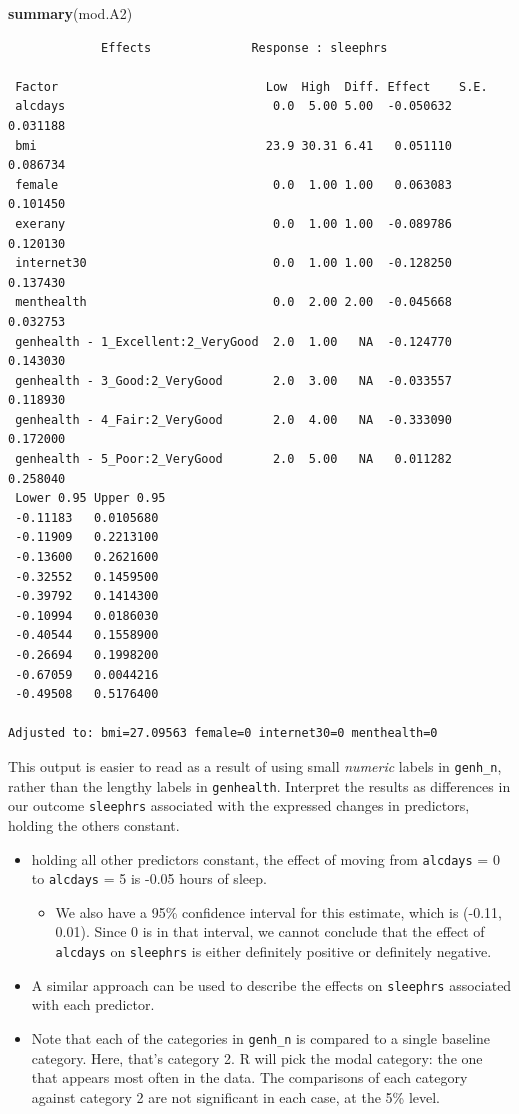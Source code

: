 \documentclass[]{book}
\newenvironment{Shaded}{\begin{snugshade}}{\end{snugshade}}
\newcommand{\KeywordTok}[1]{\textcolor[rgb]{0.13,0.29,0.53}{\textbf{#1}}}
\newcommand{\NormalTok}[1]{#1}
\providecommand{\tightlist}{%
  \setlength{\itemsep}{0pt}\setlength{\parskip}{0pt}}
\theoremstyle{definition}
\theoremstyle{definition}
\theoremstyle{definition}
\theoremstyle{remark}
\begin{document}
\begin{Shaded}
\begin{Highlighting}[]
\KeywordTok{summary}\NormalTok{(mod.A2)}
\end{Highlighting}
\end{Shaded}

\begin{verbatim}
             Effects              Response : sleephrs 

 Factor                             Low  High  Diff. Effect    S.E.    
 alcdays                             0.0  5.00 5.00  -0.050632 0.031188
 bmi                                23.9 30.31 6.41   0.051110 0.086734
 female                              0.0  1.00 1.00   0.063083 0.101450
 exerany                             0.0  1.00 1.00  -0.089786 0.120130
 internet30                          0.0  1.00 1.00  -0.128250 0.137430
 menthealth                          0.0  2.00 2.00  -0.045668 0.032753
 genhealth - 1_Excellent:2_VeryGood  2.0  1.00   NA  -0.124770 0.143030
 genhealth - 3_Good:2_VeryGood       2.0  3.00   NA  -0.033557 0.118930
 genhealth - 4_Fair:2_VeryGood       2.0  4.00   NA  -0.333090 0.172000
 genhealth - 5_Poor:2_VeryGood       2.0  5.00   NA   0.011282 0.258040
 Lower 0.95 Upper 0.95
 -0.11183   0.0105680 
 -0.11909   0.2213100 
 -0.13600   0.2621600 
 -0.32552   0.1459500 
 -0.39792   0.1414300 
 -0.10994   0.0186030 
 -0.40544   0.1558900 
 -0.26694   0.1998200 
 -0.67059   0.0044216 
 -0.49508   0.5176400 

Adjusted to: bmi=27.09563 female=0 internet30=0 menthealth=0  
\end{verbatim}

This output is easier to read as a result of using small \emph{numeric}
labels in \texttt{genh\_n}, rather than the lengthy labels in
\texttt{genhealth}. Interpret the results as differences in our outcome
\texttt{sleephrs} associated with the expressed changes in predictors,
holding the others constant.

\begin{itemize}
\tightlist
\item
  holding all other predictors constant, the effect of moving from
  \texttt{alcdays} = 0 to \texttt{alcdays} = 5 is -0.05 hours of sleep.

  \begin{itemize}
  \tightlist
  \item
    We also have a 95\% confidence interval for this estimate, which is
    (-0.11, 0.01). Since 0 is in that interval, we cannot conclude that
    the effect of \texttt{alcdays} on \texttt{sleephrs} is either
    definitely positive or definitely negative.
  \end{itemize}
\item
  A similar approach can be used to describe the effects on
  \texttt{sleephrs} associated with each predictor.
\item
  Note that each of the categories in \texttt{genh\_n} is compared to a
  single baseline category. Here, that's category 2. R will pick the
  modal category: the one that appears most often in the data. The
  comparisons of each category against category 2 are not significant in
  each case, at the 5\% level.
\end{itemize}
\end{document}
